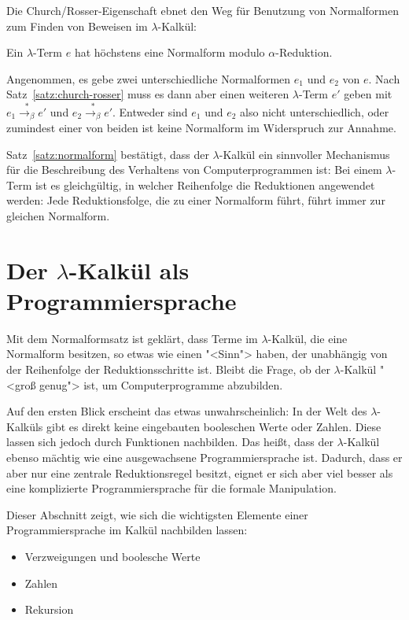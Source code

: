 Die Church/Rosser-Eigenschaft ebnet den Weg für Benutzung von
Normalformen zum Finden von Beweisen im $\lambda$-Kalkül:
%
\begin{satz}
  \label{satz:normalform}
  Ein $\lambda$-Term $e$ hat höchstens eine Normalform modulo
  $\alpha$-Reduktion.
\end{satz}
%
  \begin{beweis}
    Angenommen, es gebe zwei unterschiedliche Normalformen $e_1$ und
    $e_2$ von $e$.  Nach Satz~\ref{satz:church-rosser} muss es dann
    aber einen weiteren $\lambda$-Term $e'$ geben mit   $e_1\overset{\ast}{\rightarrow_\beta} e'$ und
  $e_2\overset{\ast}{\rightarrow_\beta} e'$.  Entweder sind $e_1$ und
    $e_2$ also nicht unterschiedlich, oder zumindest einer von
    beiden ist keine Normalform im Widerspruch zur Annahme.
  \end{beweis}
%
  Satz~\ref{satz:normalform} bestätigt, dass
  der $\lambda$-Kalkül ein sinnvoller Mechanismus für die Beschreibung
  des Verhaltens von Computerprogrammen ist: Bei einem $\lambda$-Term
  ist es gleichgültig, in welcher Reihenfolge die Reduktionen
  angewendet werden: Jede Reduktionsfolge, die zu einer Normalform
  führt, führt immer zur gleichen Normalform.

\section{Der $\lambda$-Kalkül als Programmiersprache}
\label{sec:lambdaprog}

Mit dem Normalformsatz ist geklärt, dass Terme im
$\lambda$-Kalkül, die eine Normalform besitzen, so etwas wie einen
"<Sinn"> haben, der unabhängig von der Reihenfolge der
Reduktionsschritte ist.  Bleibt die Frage, ob der $\lambda$-Kalkül
"<groß genug"> ist, um Computerprogramme abzubilden.

Auf den ersten Blick erscheint das etwas unwahrscheinlich: In der Welt
des $\lambda$-Kalküls gibt es direkt
keine eingebauten booleschen Werte oder Zahlen.
Diese lassen sich jedoch durch Funktionen nachbilden.  Das heißt,
dass der $\lambda$-Kalkül ebenso mächtig wie eine ausgewachsene
Programmiersprache ist.  Dadurch, dass er aber nur eine zentrale
Reduktionsregel besitzt, eignet er sich aber viel besser als eine
komplizierte Programmiersprache für die formale Manipulation.

Dieser Abschnitt zeigt, wie sich die wichtigsten Elemente einer
Programmiersprache im Kalkül nachbilden lassen:
%
\begin{itemize}
\item Verzweigungen und boolesche Werte
\item Zahlen
\item Rekursion
\end{itemize}
%
